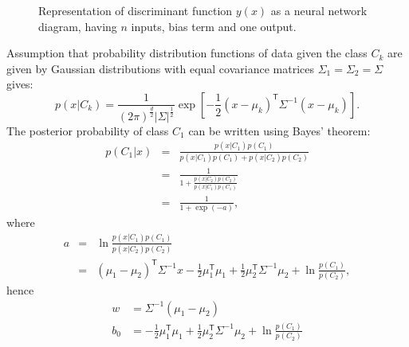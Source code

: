 \documentclass[]{article}
\theoremstyle{definition}
\begin{document}
	\begin{SCfigure}
		\centering

	\caption{ Representation of discriminant function $y(x)$ as a neural network diagram, having $n$ inputs, bias term and one output.  }
	\end{SCfigure}

%
Assumption that probability distribution functions of data given the class $C_k$ are given by Gaussian distributions with equal covariance matrices $ \Sigma_1 = \Sigma_2 = \Sigma$ gives:
%
\begin{equation}
p(x|C_k) = \frac{1}{\left(2 \pi\right)^{\frac{d}{2}} \left| \Sigma \right|^{\frac{1}{2}}} \exp \left[ -\frac{1}{2} \left(x - \mu_k\right)^\mathsf{T} \Sigma^{-1} \left(x - \mu_k \right) \right].
\end{equation}
%
The posterior probability of class $C_1$ can be written using Bayes' theorem:
%
\begin{eqnarray}
	p(C_1 | x) &=& \frac{p(x|C_1) p(C_1)}{ p(x|C_1) p(C_1) + p(x|C_2)p(C_2)} \nonumber\\
			   &=& \frac{1}{1 + \frac{p(x|C_2)p(C_2)}{p(x|C_1)p(C_1)}} \nonumber\\ 
			   &=& \frac{1}{1 + \exp(-a)},
\end{eqnarray}
%
where
%
\begin{eqnarray}
 a &=& \ln \frac{p(x|C_1)p(C_1)}{p(x|C_2)p(C_2)} \nonumber \\
 &=& \left( \mu_1 - \mu_2 \right)^{\mathsf{T}} \Sigma^{-1} x  - \frac{1}{2} \mu_1^\mathsf{T}\mu_1 + \frac{1}{2} \mu_2^\mathsf{T} \Sigma^{-1} \mu_2 + \ln \frac{p(C_1)}{p(C_2)},
\end{eqnarray}
%
hence
%
\begin{subequations}
	\begin{align}
		w &= \Sigma^{-1} \left(\mu_1 - \mu_2\right)\\
		b_0 &= - \frac{1}{2} \mu_1^\mathsf{T}\mu_1 + \frac{1}{2} \mu_2^\mathsf{T} \Sigma^{-1} \mu_2 + \ln \frac{p(C_1)}{p(C_2)}
	\end{align}
\end{subequations}
\end{document}
